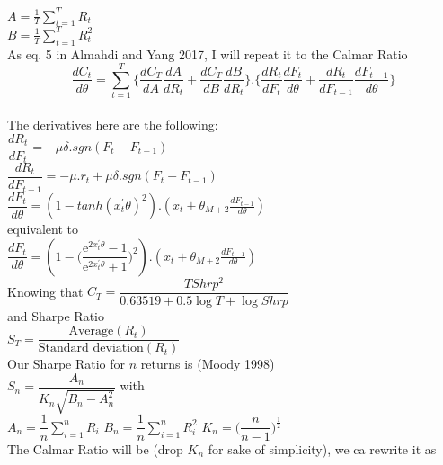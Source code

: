 \documentclass[parskip=full]{scrartcl}
\begin{document}
$ A = \frac{1}{T}\sum_{t=1}^{T}R_t $\\

$ B = \frac{1}{T}\sum_{t=1}^{T}R_{t}^{2} $\\

As eq. 5 in Almahdi and Yang 2017, I will repeat it to the Calmar Ratio\\

$$ \frac{dC_t}{d\theta} = \sum_{t=1}^{T}  \{\frac{dC_T}{dA}\frac{dA}{dR_t}+\frac{dC_T}{dB}\frac{dB}{dR_t}\}.\{\frac{dR_t}{dF_t}\frac{dF_t}{d\theta}+\frac{dR_t}{dF_{t-1}}\frac{dF_{t-1}}{d\theta}\} $$\\

The derivatives here are the following:\\

$ \dfrac{dR_t}{dF_t} = -\mu\delta.sgn(F_t - F_{t-1}) $\\

$ \dfrac{dR_t}{dF_{t-1}} = -\mu.r_t+\mu\delta.sgn(F_t - F_{t-1}) $\\

$ \dfrac{dF_t}{d\theta} = (1-tanh(x_{t}^{'}\theta)^2).(x_t + \theta_{M+2}\frac{dF_{t-1}}{d\theta}) $\\

equivalent to\\

$ \dfrac{dF_t}{d\theta} = (1-\bigg(\dfrac{\mathrm{e}^{2x_{t}^{'}\theta}-1}{\mathrm{e}^{2x_{t}^{'}\theta}+1}\bigg)^2).(x_t + \theta_{M+2}\frac{dF_{t-1}}{d\theta}) $\\

Knowing that $ C_T  = \dfrac{TShrp^2}{0.63519 + 0.5\log T + \log Shrp}$\\

and Sharpe Ratio\\

$ S_T = \dfrac{\text{Average}(R_t)}{\text{Standard deviation}(R_t)} $\\

Our Sharpe Ratio for $ n $ returns is (Moody 1998)\\

$ S_n = \dfrac{A_n}{K_n\sqrt{B_n - A_{n}^{2}}} $ with\\

$ A_n = \dfrac{1}{n}\sum_{i=1}^{n}R_i $	$ B_n = \dfrac{1}{n}\sum_{i=1}^{n}R_{i}^{2} $	$ K_n = \bigg(\dfrac{n}{n-1}\bigg)^{\frac{1}{2}} $\\

The Calmar Ratio will be (drop $K_n$ for sake of simplicity), we ca rewrite it as\\
\end{document}
